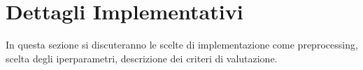 \section{Dettagli Implementativi}\cite{STATISTICALLEARNING}\cite{ML2}\cite{StackOverflow}
In questa sezione si discuteranno le scelte di implementazione come preprocessing, scelta degli iperparametri, descrizione dei criteri di valutazione.







